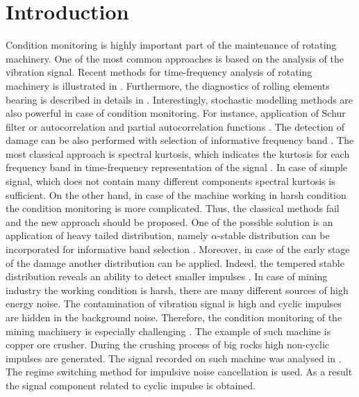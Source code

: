 \documentclass[conference,a4paper]{IEEEtran}
\begin{document}




%
\IEEEpeerreviewmaketitle



\section{Introduction}
Condition monitoring is highly important part of the maintenance of rotating machinery. One of the most common approaches is based on the analysis of the vibration signal. Recent methods for time-frequency analysis of rotating machinery is illustrated in \cite{feng2013recent,obuchowski2014recent}. Furthermore, the diagnostics of rolling elements bearing is described in details in \cite{randall2011rolling}. Interestingly, stochastic modelling methods are also powerful in case of condition monitoring. For instance, application of Schur filter \cite{Makowski2014130, lopatka2005effective} or autocorrelation and partial autocorrelation functions \cite{zak2014novel}.
The detection of damage can be also performed with selection of informative frequency band \cite{obuchowski2014selection}. The most classical approach is spectral kurtosis, which indicates the kurtosis for each frequency band in time-frequency representation of the signal \cite{antoni2006spectral, combet2009optimal}. In case of simple signal, which does not contain many different components spectral kurtosis is sufficient. On the other hand, in case of the machine working in harsh condition the condition monitoring is more complicated. Thus, the classical methods fail and the new approach should be proposed. One of the possible solution is an application of heavy tailed distribution, namely $\alpha$-stable distribution can be incorporated for informative band selection \cite{zak2016data}. Moreover, in case of the early stage of the damage another distribution can be applied. Indeed, the tempered stable distribution reveals an ability to detect smaller impulses \cite{wylomanska2016application}. In case of mining industry the working condition is harsh, there are many different sources of high energy noise. The contamination of vibration signal is high and cyclic impulses are hidden in the background noise. Therefore, the condition monitoring of the mining machinery is especially challenging \cite{bartelmus2014object}. The example of such machine is copper ore crusher. During the crushing process of big rocks high non-cyclic impulses are generated. The signal recorded on such machine was analysed in \cite{wylomanskaimpulsive}. The regime switching method for impulsive noise cancellation is used. As a result the signal component related to cyclic impulse is obtained. 
\end{document}
